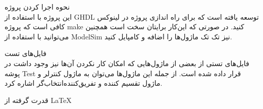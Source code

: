 \documentclass{article}[12pt]
\begin{document}
نحوه اجرا کردن پروژه\\
این پروژه با استفاده از GHDL توسعه یافته است که برای راه اندازی پروژه در لینوکس کافی است که پروژه make کنید. در صورتی که این‌کار برایتان سخت است همچنین می‌توانید با استفاده از ModelSim نیز تک تک ماژول‌ها را اضافه و کامپایل کنید.

فایل‌های تست\\
فایل‌های تستی از بعضی از ماژول‌هایی که امکان کار نکردن آن‌ها نیز وجود داشت در پوشه Test قرار داده شده است. از جمله این ماژول‌ها می‌توان به ماژول کنترلر و ماژول تقسیم کننده و تفریق‌کننده‌انتخاب‌گر اشاره کرد.\\

\begin{centering}
قدرت گرفته از \LaTeX
\end{centering}
\end{document}
